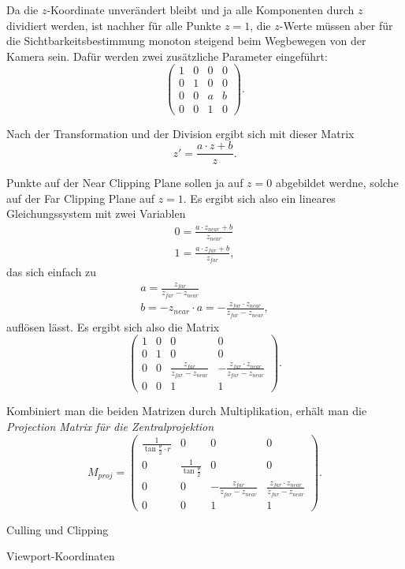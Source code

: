 Da die $z$-Koordinate unverändert bleibt und ja alle Komponenten durch $z$ dividiert werden, ist nachher für alle Punkte $z=1$, die $z$-Werte müssen aber für die Sichtbarkeitsbestimmung monoton steigend beim Wegbewegen von der Kamera sein. Dafür werden zwei zusätzliche Parameter eingeführt:
\begin{equation}
 \begin{pmatrix}
  1 & 0 & 0 & 0 \\
  0 & 1 & 0 & 0 \\
  0 & 0 & a & b \\
  0 & 0 & 1 & 0
 \end{pmatrix}.
\end{equation}

Nach der Transformation und der Division ergibt sich mit dieser Matrix
\begin{equation}
 z' = \frac{a \cdot z + b}{z}.
\end{equation}

Punkte auf der Near Clipping Plane sollen ja auf $z=0$ abgebildet werdne, solche auf der Far Clipping Plane auf $z=1$. Es ergibt sich also ein lineares Gleichungssystem mit zwei Variablen
\begin{equation}
\begin{split}
 0 = \frac{a \cdot z_{near} + b}{z_{near}} \\
 1 = \frac{a \cdot z_{far} + b}{z_{far}},
\end{split}
\end{equation}
das sich einfach zu
\begin{equation}
\begin{split}
 a = \frac{z_{far}}{z_{far}-z_{near}} \\
 b = -z_{near} \cdot a = -\frac{z_{far} \cdot z_{near}}{z_{far}-z_{near}},
\end{split} 
\end{equation}
auflösen lässt. Es ergibt sich also die Matrix
\begin{equation}
\begin{pmatrix}
  1 & 0 & 0 & 0 \\
  0 & 1 & 0 & 0 \\
  0 & 0 & \frac{z_{far}}{z_{far}-z_{near}} & -\frac{z_{far} \cdot z_{near}}{z_{far}-z_{near}} \\
  0 & 0 & 1 & 1
 \end{pmatrix}.
\end{equation}

Kombiniert man die beiden Matrizen durch Multiplikation, erhält man die \emph{Projection Matrix für die Zentralprojektion}
\begin{equation}
 M_{proj} = 
 \begin{pmatrix}
  \frac{1}{\tan\frac{\theta}{2} \cdot r} & 0 & 0 & 0 \\
  0 & \frac{1}{\tan\frac{\theta}{2}} & 0 & 0 \\
  0 & 0 & -\frac{z_{far}}{z_{far}-z_{near}} & \frac{z_{far} \cdot z_{near}}{z_{far}-z_{near}} \\
  0 & 0 & 1 & 1
 \end{pmatrix}.
\end{equation} 

Culling und Clipping

Viewport-Koordinaten